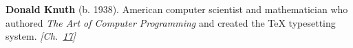 \textbf{Donald Knuth} (b. 1938). American computer scientist and mathematician who authored \emph{The Art of Computer Programming} and created the \TeX{} typesetting system. \emph{[Ch.~\hyperref[ch:bignumbers]{17}]}


